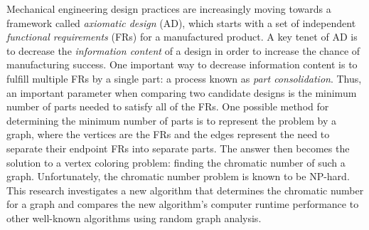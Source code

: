 Mechanical engineering design practices are increasingly moving towards a framework called \emph{axiomatic design}
(AD), which starts with a set of independent \emph{functional requirements} (FRs) for a manufactured product.  A
key tenet of AD is to decrease the \emph{information content} of a design in order to increase the chance of
manufacturing success.  One important way to decrease information content is to fulfill multiple FRs by a single
part: a process known as \emph{part consolidation}.  Thus, an important parameter when comparing two candidate
designs is the minimum number of parts needed to satisfy all of the FRs.  One possible method for determining the
minimum number of parts is to represent the problem by a graph, where the vertices are the FRs and the edges
represent the need to separate their endpoint FRs into separate parts.  The answer then becomes the solution to a
vertex coloring problem: finding the chromatic number of such a graph.  Unfortunately, the chromatic number problem
is known to be NP-hard.  This research investigates a new algorithm that determines the chromatic number for a
graph and compares the new algorithm's computer runtime performance to other well-known algorithms using random
graph analysis.
